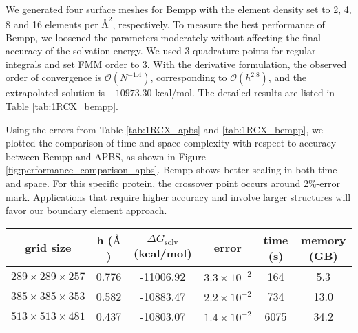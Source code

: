We generated four surface meshes for Bempp with the element density set to 2, 4, 8 and 16 elements per $\si{\angstrom}^{2}$, respectively.
To measure the best performance of Bempp, we loosened the parameters moderately without affecting the final accuracy of the solvation energy.
We used 3 quadrature points for regular integrals and set FMM order to 3.
With the derivative formulation, the observed order of convergence is $\mathcal{O}(N^{-1.4})$, corresponding to $\mathcal{O}(h^{2.8})$, and the extrapolated solution is $-10973.30$ kcal/mol.
The detailed results are listed in Table \ref{tab:1RCX_bempp}.

Using the errors from Table \ref{tab:1RCX_apbs} and \ref{tab:1RCX_bempp}, we plotted the comparison of time and space complexity with respect to accuracy between Bempp and APBS, as shown in Figure \ref{fig:performance_comparison_apbs}.
Bempp shows better scaling in both time and space.
For this specific protein, the crossover point occurs around 2\%-error mark.
Applications that require higher accuracy and involve larger structures will favor our boundary element approach.

\begin{table*}[]
    \centering
    \begin{tabular}{cc|cc|cc}
    grid size                   & h ($\si{\angstrom}$) & $\Delta G_{\mathrm{solv}}$ (kcal/mol) & error               & time (s) & memory (GB) \\ \hline
    $289 \times 289 \times 257$ & 0.776                & -11006.92                             & $3.3\times 10^{-2}$ & 164      & 5.3         \\
    $385 \times 385 \times 353$ & 0.582                & -10883.47                             & $2.2\times 10^{-2}$ & 734      & 13.0        \\
    $513 \times 513 \times 481$ & 0.437                & -10803.07                             & $1.4\times 10^{-2}$ & 6075     & 34.2       
    \end{tabular}
    \caption{Results of computing the solvation energy of 1RCX using the \texttt{mg-auto} solver in APBS.
    Error is calculated based on the extrapolated solution $-10652.89$ kcal/mol.}
    \label{tab:1RCX_apbs}
\end{table*}

